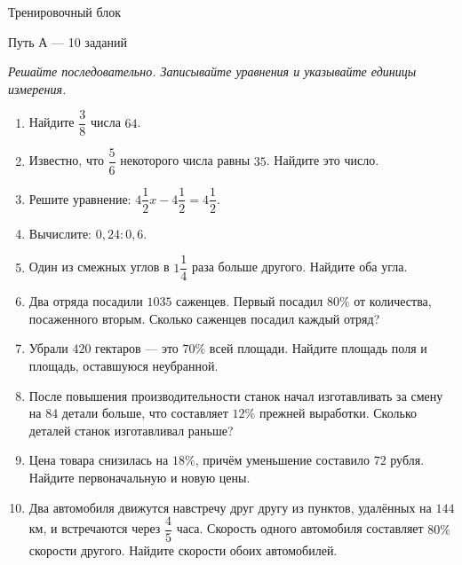 \documentclass[a4paper,12pt]{article}
\newcommand{\ruleline}{\par\vspace{-2pt}{\color{accent}\hrule height 0.55pt}\vspace{8pt}}
\begin{document}
\clearpage
\begin{center}
{\LARGE\color{deep}Тренировочный блок}\par
\vspace{2mm}
{\normalsize Путь А --- 10 заданий}\par
\end{center}
\ruleline
\textit{Решайте последовательно. Записывайте уравнения и указывайте единицы измерения.}
\begin{enumerate}[label=\textbf{\arabic*.},leftmargin=9mm,itemsep=7pt]
\item Найдите $\dfrac38$ числа $64$.
\item Известно, что $\dfrac56$ некоторого числа равны $35$. Найдите это число.
\item Решите уравнение: $4\dfrac12x-4\dfrac12=4\dfrac12$.
\item Вычислите: $0{,}24:0{,}6$.
\item Один из смежных углов в $1\dfrac14$ раза больше другого. Найдите оба угла.
\item Два отряда посадили $1035$ саженцев. Первый посадил $80\%$ от количества, посаженного вторым. Сколько саженцев посадил каждый отряд?
\item Убрали $420$ гектаров --- это $70\%$ всей площади. Найдите площадь поля и площадь, оставшуюся неубранной.
\item После повышения производительности станок начал изготавливать за смену на $84$ детали больше, что составляет $12\%$ прежней выработки. Сколько деталей станок изготавливал раньше?
\item Цена товара снизилась на $18\%$, причём уменьшение составило $72$ рубля. Найдите первоначальную и новую цены.
\item Два автомобиля движутся навстречу друг другу из пунктов, удалённых на $144$ км, и встречаются через $\dfrac45$ часа. Скорость одного автомобиля составляет $80\%$ скорости другого. Найдите скорости обоих автомобилей.
\end{enumerate}
\end{document}
